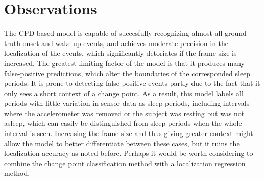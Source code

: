 \documentclass{article}
\begin{document}
\section{Observations}

The CPD based model is capable of succesfully recognizing almost all ground-truth onset and wake up events, and achieves moderate precision in the localization of the events, which significantly detoriates if the frame size is increased. The greatest limiting factor of the model is that it produces many false-positive predictions, which alter the boundaries of the corresponded sleep periods. It is prone to detecting false positive events partly due to the fact that it only sees a short context of a change point. As a result, this model labels all periods with little variation in sensor data as sleep periods, including intervals where the accelerometer was removed or the subject was resting but was not asleep, which can easily be distinguished from sleep periods when the whole interval is seen. Increasing the frame size and thus giving greater context might allow the model to better differentiate between these cases, but it ruins the localization accuracy as noted before. Perhaps it would be worth considering to combine the change point classification method with a localization regression method.






\end{document}
